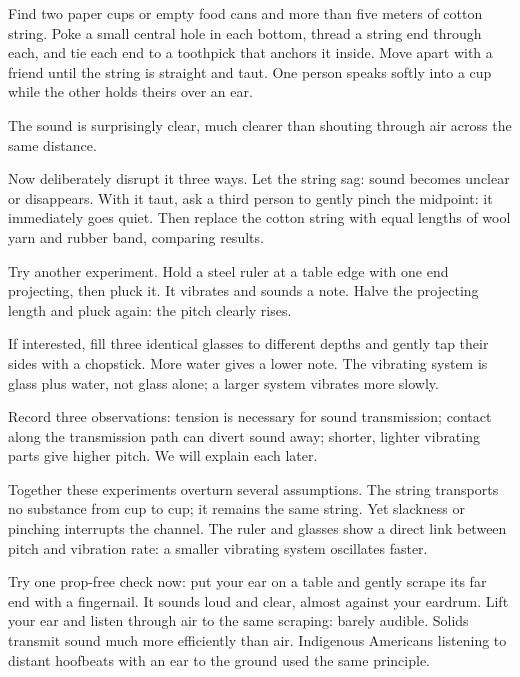 
\begin{experiment}
Find two paper cups or empty food cans and more than five meters of cotton string. Poke a small central hole in each bottom, thread a string end through each, and tie each end to a toothpick that anchors it inside. Move apart with a friend until the string is straight and taut. One person speaks softly into a cup while the other holds theirs over an ear.

The sound is surprisingly clear, much clearer than shouting through air across the same distance.

Now deliberately disrupt it three ways. Let the string sag: sound becomes unclear or disappears. With it taut, ask a third person to gently pinch the midpoint: it immediately goes quiet. Then replace the cotton string with equal lengths of wool yarn and rubber band, comparing results.

Try another experiment. Hold a steel ruler at a table edge with one end projecting, then pluck it. It vibrates and sounds a note. Halve the projecting length and pluck again: the pitch clearly rises.

If interested, fill three identical glasses to different depths and gently tap their sides with a chopstick. More water gives a lower note. The vibrating system is glass plus water, not glass alone; a larger system vibrates more slowly.

Record three observations: tension is necessary for sound transmission; contact along the transmission path can divert sound away; shorter, lighter vibrating parts give higher pitch. We will explain each later.
\end{experiment}

\begin{mainline}
Together these experiments overturn several assumptions. The string transports no substance from cup to cup; it remains the same string. Yet slackness or pinching interrupts the channel. The ruler and glasses show a direct link between pitch and vibration rate: a smaller vibrating system oscillates faster.

Try one prop-free check now: put your ear on a table and gently scrape its far end with a fingernail. It sounds loud and clear, almost against your eardrum. Lift your ear and listen through air to the same scraping: barely audible. Solids transmit sound much more efficiently than air. Indigenous Americans listening to distant hoofbeats with an ear to the ground used the same principle.
\end{mainline}

